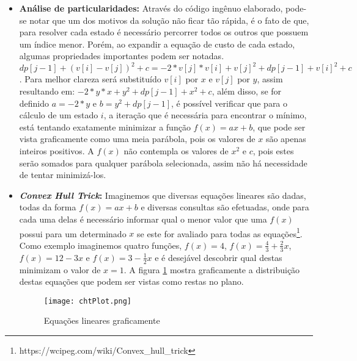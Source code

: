 \begin{itemize}
\item \textbf{Análise de particularidades:}
Através do código ingênuo elaborado, pode-se notar que um dos motivos da solução não ficar tão rápida, é o fato de que, para resolver cada estado é necessário percorrer todos os outros que possuem um índice menor. Porém, ao expandir a equação de custo de cada estado, algumas propriedades importantes podem ser notadas.
$dp[j-1] + (v[i] - v[j])^2 + c = -2*v[j]*v[i] + v[j]^2 + dp[j-1] + v[i]^2 + c$. Para melhor clareza será substituído $v[i]$ por $x$ e $v[j]$ por $y$, assim resultando em:
$-2*y*x + y^2 + dp[j-1] + x^2 + c$, além disso, se for definido $a = -2*y$ e $b = y^2 + dp[j-1]$, é possível verificar que para o cálculo de um estado $i$, a iteração que é necessária para encontrar o mínimo, está tentando exatamente minimizar a função $f(x) = ax + b$, que pode ser vista graficamente como uma meia parábola, pois os valores de $x$ são apenas inteiros positivos. A $f(x)$ não contempla os valores de $x^2$ e $c$, pois estes serão somados para qualquer parábola selecionada, assim não há necessidade de tentar minimizá-los.

\item \textbf{\textit{Convex Hull Trick}:}
Imaginemos que diversas equações lineares são dadas, todas da forma $f(x) = ax + b$ e diversas consultas são efetuadas, onde para cada uma delas é necessário informar qual o menor valor que uma $f(x)$ possui para um determinado $x$ se este for avaliado para todas as equações\footnote{https://wcipeg.com/wiki/Convex\_hull\_trick}. 
Como exemplo imaginemos quatro funções, $f(x) = 4$, $f(x) = \frac{4}{3} + \frac{2}{3}x$, $f(x) = 12 - 3x$ e $f(x) = 3 - \frac{1}{2}x$ e é desejável descobrir qual destas minimizam o valor de $x = 1$. A figura \ref{fig:chtplot} mostra graficamente a distribuição destas equações que podem ser vistas como restas no plano.

\begin{figure}[H]
	\centering
	\caption[Equações lineares graficamente]{Equações lineares graficamente}
	\texttt{[image: chtPlot.png]} %
	\label{fig:chtplot}
\end{figure}


\end{itemize}
